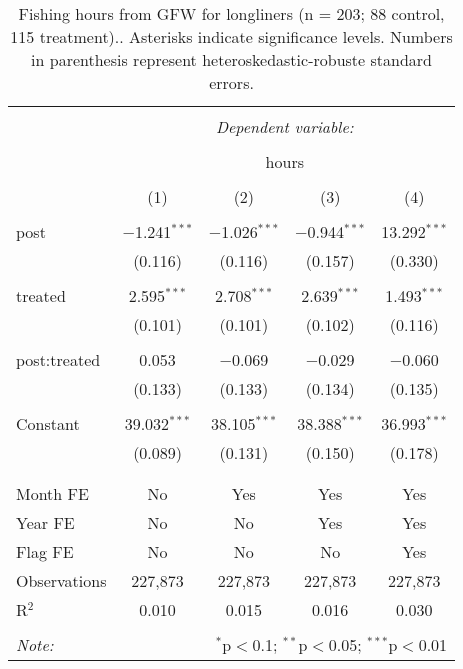 \documentclass[12pt,]{article}
\begin{document}
\begin{table}[!htbp] \centering 
  \caption{\label{tab:long}Fishing hours from GFW for longliners (n = 203; 88 control, 115 treatment).. Asterisks indicate significance levels. Numbers in parenthesis represent heteroskedastic-robuste standard errors.} 
  \label{} 
\begin{tabular}{@{\extracolsep{5pt}}lcccc} 
\\[-1.8ex]\hline 
\hline \\[-1.8ex] 
 & \multicolumn{4}{c}{\textit{Dependent variable:}} \\ 
\cline{2-5} 
\\[-1.8ex] & \multicolumn{4}{c}{hours} \\ 
\\[-1.8ex] & (1) & (2) & (3) & (4)\\ 
\hline \\[-1.8ex] 
 post & $-$1.241$^{***}$ & $-$1.026$^{***}$ & $-$0.944$^{***}$ & 13.292$^{***}$ \\ 
  & (0.116) & (0.116) & (0.157) & (0.330) \\ 
  & & & & \\ 
 treated & 2.595$^{***}$ & 2.708$^{***}$ & 2.639$^{***}$ & 1.493$^{***}$ \\ 
  & (0.101) & (0.101) & (0.102) & (0.116) \\ 
  & & & & \\ 
 post:treated & 0.053 & $-$0.069 & $-$0.029 & $-$0.060 \\ 
  & (0.133) & (0.133) & (0.134) & (0.135) \\ 
  & & & & \\ 
 Constant & 39.032$^{***}$ & 38.105$^{***}$ & 38.388$^{***}$ & 36.993$^{***}$ \\ 
  & (0.089) & (0.131) & (0.150) & (0.178) \\ 
  & & & & \\ 
\hline \\[-1.8ex] 
Month FE & No & Yes & Yes & Yes \\ 
Year FE & No & No & Yes & Yes \\ 
Flag FE & No & No & No & Yes \\ 
Observations & 227,873 & 227,873 & 227,873 & 227,873 \\ 
R$^{2}$ & 0.010 & 0.015 & 0.016 & 0.030 \\ 
\hline 
\hline \\[-1.8ex] 
\textit{Note:}  & \multicolumn{4}{r}{$^{*}$p$<$0.1; $^{**}$p$<$0.05; $^{***}$p$<$0.01} \\ 
\end{tabular} 
\end{table}
\end{document}

